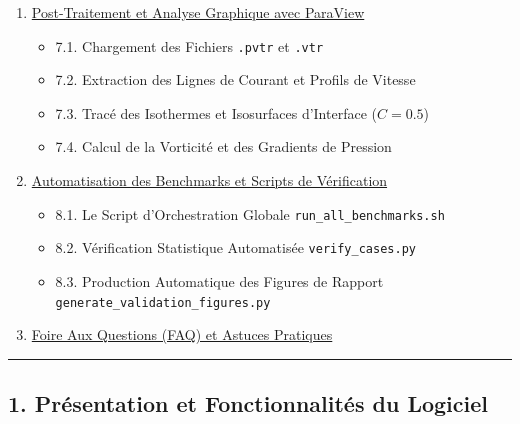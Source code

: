 \documentclass[
  french,
]{article}
\providecommand{\tightlist}{%
  \setlength{\itemsep}{0pt}\setlength{\parskip}{0pt}}
\begin{document}
\begin{enumerate}
  \begin{itemize}
  \tightlist
  \item
    6.1. Interprétation du Tableau de Bord Console
  \item
    6.2. Détection Précoce des Instabilités et Divergences
  \item
    6.3. Guide de Dépannage et Stratégies de Remédiation
  \end{itemize}
\item
  \hyperref[7-post-traitement-et-analyse-graphique-avec-paraview]{Post-Traitement
  et Analyse Graphique avec ParaView}

  \begin{itemize}
  \tightlist
  \item
    7.1. Chargement des Fichiers \texttt{.pvtr} et \texttt{.vtr}
  \item
    7.2. Extraction des Lignes de Courant et Profils de Vitesse
  \item
    7.3. Tracé des Isothermes et Isosurfaces d'Interface (\(C = 0.5\))
  \item
    7.4. Calcul de la Vorticité et des Gradients de Pression
  \end{itemize}
\item
  \hyperref[8-automatisation-des-benchmarks-et-scripts-de-vuxe9rification]{Automatisation
  des Benchmarks et Scripts de Vérification}

  \begin{itemize}
  \tightlist
  \item
    8.1. Le Script d'Orchestration Globale
    \texttt{run\_all\_benchmarks.sh}
  \item
    8.2. Vérification Statistique Automatisée \texttt{verify\_cases.py}
  \item
    8.3. Production Automatique des Figures de Rapport
    \texttt{generate\_validation\_figures.py}
  \end{itemize}
\item
  \hyperref[9-foire-aux-questions-faq-et-astuces-pratiques]{Foire Aux
  Questions (FAQ) et Astuces Pratiques}
\end{enumerate}

\begin{center}\rule{0.5\linewidth}{0.5pt}\end{center}

\subsection{1. Présentation et Fonctionnalités du
Logiciel}\label{pruxe9sentation-et-fonctionnalituxe9s-du-logiciel}
\end{document}

